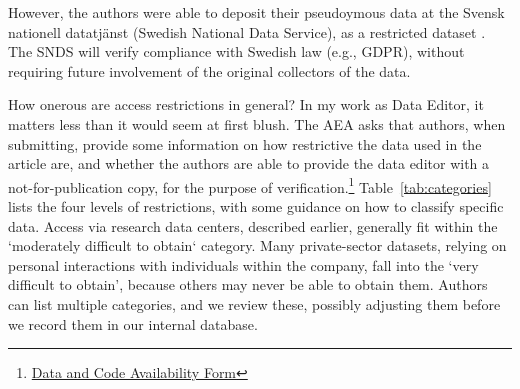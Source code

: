 \documentclass{article}
\begin{document}
%
%
However, the authors were able to deposit their pseudoymous data at the Svensk nationell datatjänst (Swedish National Data Service), as a restricted dataset \citep{ahrsjo_data_2023}. The SNDS will verify compliance with Swedish law (e.g., \ac{GDPR}), without requiring future involvement of the original collectors of the data. 

How onerous are access restrictions in general? In my work as Data Editor, it matters less than it would seem at first blush. The AEA asks that authors, when submitting, provide some information on how restrictive the data used in the article are, and whether the authors are able to provide the data editor with a not-for-publication copy, for the purpose of verification.\footnote{\href{https://www.aeaweb.org/journals/forms/data-code-availability}{Data and Code Availability Form}} Table~\ref{tab:categories} lists the four levels of restrictions, with some guidance on how to classify specific data. Access via research data centers, described earlier, generally fit within the `moderately difficult to obtain` category. Many private-sector datasets, relying on personal interactions with individuals within the company, fall into the `very difficult to obtain', because others may never be able to obtain them. Authors can list multiple categories, and we review these, possibly adjusting them before we record them in our internal database. 


\end{document}
